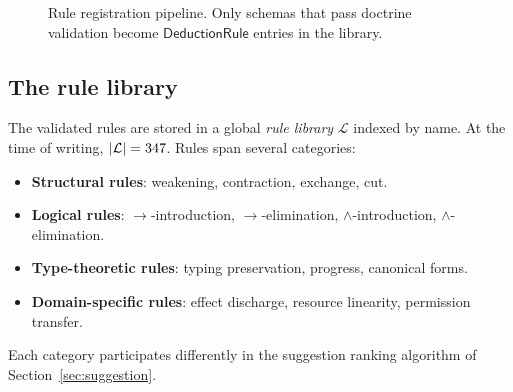 \documentclass[11pt]{article}
\newcommand{\DR}{\ensuremath{\mathsf{DeductionRule}}}
\begin{document}
\begin{figure}[t]
\centering
{}
\caption{Rule registration pipeline.  Only schemas that pass
  doctrine validation become $\DR$ entries in the library.}
\label{fig:pipeline}
\end{figure}

\subsection{The rule library}\label{ssec:library}

The validated rules are stored in a global \emph{rule library}
$\mathcal{L}$ indexed by name.  At the time of writing,
$|\mathcal{L}| = 347$.  Rules span several
categories:
\begin{itemize}
  \item \textbf{Structural rules}: weakening, contraction,
    exchange, cut.
  \item \textbf{Logical rules}: $\to$-introduction,
    $\to$-elimination, $\land$-introduction, $\land$-elimination.
  \item \textbf{Type-theoretic rules}: typing preservation,
    progress, canonical forms.
  \item \textbf{Domain-specific rules}: effect discharge, resource
    linearity, permission transfer.
\end{itemize}
Each category participates differently in the suggestion ranking
algorithm of Section~\ref{sec:suggestion}.
\end{document}
